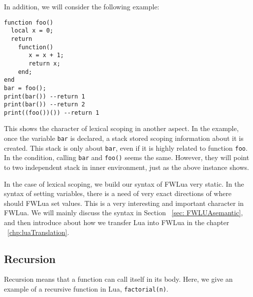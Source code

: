 


In addition, we will consider the following example:
\begin{verbatim}
function foo()
  local x = 0;
  return 
    function() 
       x = x + 1;
       return x; 
    end;
end
bar = foo();
print(bar()) --return 1
print(bar()) --return 2
print((foo())()) --return 1
\end{verbatim}

This shows the character of lexical scoping in another aspect.
In the example, once the variable {\tt bar} is declared, a stack stored scoping information about it is created.
This stack is only about {\tt bar}, even if it is highly related to function {\tt foo}.
In the condition, calling {\tt bar} and {\tt foo()} seems the same. However, they will point to two independent stack in inner environment, just as the above instance shows.

In the case of lexical scoping, we build our syntax of FWLua very static. In the syntax of setting variables, there is a need of very exact directions of where should FWLua set values. This is a very interesting and important character in FWLua. We will mainly discuss the syntax in Section ~\ref{sec: FWLUAsemantic}, and then introduce about how we transfer Lua into FWLua in the chapter ~\ref{chp:luaTranslation}.


\subsection{Recursion}\label{sec:recursions}

Recursion means that a function can call itself in its body.
Here, we give an example of a recursive function in Lua, {\tt factorial(n)}.


